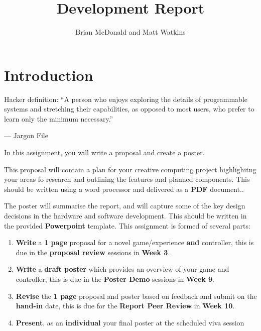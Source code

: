 \documentclass{../../fal_assignment}
\title{Development Report}
\author{Brian McDonald and Matt Watkins}
\begin{document}
\maketitle

\section*{Introduction}

\begin{marginquote}
Hacker definition: ``A person who enjoys exploring the details of programmable systems and stretching their capabilities, as opposed to most users, who prefer to learn only the minimum necessary.''

--- Jargon File

\end{marginquote}

In this assignment, you will write a proposal and create a poster. 

This proposal will contain a plan for your creative computing project highlighitng your areas fo research and outlining the features and planned components.	This should be written using a word processor and delivered as a \textbf{PDF} document..

The poster will summarise the report, and will capture some of the key design decisions in the 
hardware and software development. This should be written in the provided \textbf{Powerpoint} template.
This assignment is formed of several parts:

\begin{enumerate}[label=(\Alph*)]
    \item \textbf{Write} a \textbf{1 page} proposal for a novel game/experience \textbf{and} controller, this is due in the \textbf{proposal review} sessions in \textbf{Week 3}. 
	\item \textbf{Write} a \textbf{draft poster} which provides an overview of your game and controller, this is due in the \textbf{Poster Demo} sessions in \textbf{Week 9}. 
	\item \textbf{Revise} the \textbf{1 page} proposal and poster based on feedback and submit on the \textbf{hand-in} date, this is due for the \textbf{Report Peer Review} in \textbf{Week 10}. 
	\item \textbf{Present}, as an \textbf{individual} your final poster at the scheduled viva session
\end{enumerate}
\end{document}
